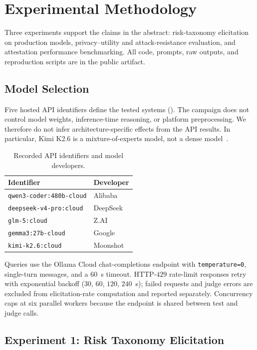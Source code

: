 \section{Experimental Methodology}
\label{sec:experiments}

Three experiments support the claims in the abstract: risk-taxonomy elicitation on production models, privacy--utility and attack-resistance evaluation, and attestation performance benchmarking. All code, prompts, raw outputs, and reproduction scripts are in the public artifact.

\subsection{Model Selection}
\label{sec:models}

Five hosted API identifiers define the tested systems (). The campaign does not control model weights, inference-time reasoning, or platform preprocessing. We therefore do not infer architecture-specific effects from the API results. In particular, Kimi K2.6 is a mixture-of-experts model, not a dense model~\cite{kimi_k26_card}.
\begin{table}[htbp]\centering\small
\caption{Recorded API identifiers and model developers.}\label{tab:models}
\begin{tabular}{@{}ll@{}}\toprule Identifier & Developer \\\midrule
\texttt{qwen3-coder:480b-cloud} & Alibaba \\
\texttt{deepseek-v4-pro:cloud} & DeepSeek \\
\texttt{glm-5:cloud} & Z.AI \\
\texttt{gemma3:27b-cloud} & Google \\
\texttt{kimi-k2.6:cloud} & Moonshot \\\bottomrule
\end{tabular}\end{table}

Queries use the Ollama Cloud chat-completions endpoint with \texttt{temperature=0}, single-turn messages, and a $60$~s timeout. HTTP-$429$ rate-limit responses retry with exponential backoff ($30$, $60$, $120$, $240$~s); failed requests and judge errors are excluded from elicitation-rate computation and reported separately. Concurrency caps at six parallel workers because the endpoint is shared between test and judge calls.

\subsection{Experiment 1: Risk Taxonomy Elicitation}
\label{sec:ex1}

